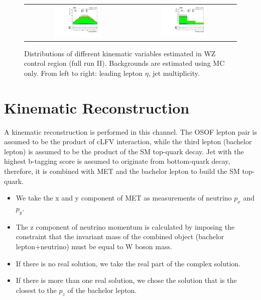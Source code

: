 \begin{figure}[tbh!]
 \begin{center}
 \begin{tabular}{cc}
 \includegraphics[width=0.45\textwidth]{figures/Part3/Selection/WZ/mumumu/lep1Eta}&
 \includegraphics[width=0.45\textwidth]{figures/Part3/Selection/WZ/mumumu/njet} \\
 \end{tabular}
 \caption{Distributions of different kinematic variables estimated in WZ control region (full run II). Backgrounds are estimated using MC only. From left to right: leading lepton $\eta$, jet multiplicity.}
 \label{fig:WZ_mumumu}
 \end{center}
\end{figure}
\section{Kinematic Reconstruction}
\label{sec:Kin}
A kinematic reconstruction is performed in this channel. The OSOF lepton pair is assumed to be the product of cLFV interaction, while the third lepton (bachelor lepton) is assumed to be the product of the SM top-quark decay. Jet with the highest b-tagging score is assumed to originate from bottom-quark decay, therefore, it is combined with MET and the bachelor lepton to build the SM top-quark. 

\begin{itemize}
\item We take the x and y component of MET as measurements of neutrino $p_x$ and $p_y$. 
\item The z component of neutrino momentum is calculated by imposing the constraint that the invariant mass of the combined object (bachelor lepton+neutrino) must be equal to W boson mass.
\item If there is no real solution, we take the real part of the complex solution.
\item If there is more than one real solution, we chose the solution that is the closest to the $p_z$ of the bachelor lepton.
\end{itemize}

